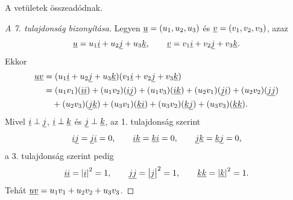 \documentclass[11pt]{article}
\begin{document}
\begin{notefig}{A vetületek összeadódnak.}
\end{notefig}

\begin{proof}[A 7. tulajdonság bizonyítása]
Legyen $\underline{u}=(u_{1}, u_{2}, u_{3})$ és $\underline{v}=(v_{1}, v_{2}, v_{3})$, azaz
\[
\underline{u}=u_{1}\underline{i}+u_{2}\underline{j}+u_{3}\underline{k},\qquad
\underline{v}=v_{1}\underline{i}+v_{2}\underline{j}+v_{3}\underline{k} .
\]
Ekkor
\begin{align*}
\underline{u}\underline{v}&=(u_{1}\underline{i}+u_{2}\underline{j}+u_{3}\underline{k})(v_{1}\underline{i}+v_{2}\underline{j}+v_{3}\underline{k})\\
&=(u_{1}v_{1})(\underline{i}\underline{i})+(u_{1}v_{2})(\underline{i}\underline{j})+(u_{1}v_{3})(\underline{i}\underline{k})
+(u_{2}v_{1})(\underline{j}\underline{i})+(u_{2}v_{2})(\underline{j}\underline{j})\\
&\quad +(u_{2}v_{3})(\underline{j}\underline{k})+(u_{3}v_{1})(\underline{k}\underline{i})+(u_{3}v_{2})(\underline{k}\underline{j})
+(u_{3}v_{3})(\underline{k}\underline{k}).
\end{align*}
Mivel $\underline{i}\perp\underline{j}$, $\underline{i}\perp\underline{k}$ és $\underline{j}\perp\underline{k}$, az 1. tulajdonság szerint
\[
\underline{i}\underline{j}=\underline{j}\underline{i}=0,\qquad \underline{i}\underline{k}=\underline{k}\underline{i}=0,\qquad
\underline{j}\underline{k}=\underline{k}\underline{j}=0,
\]
a 3. tulajdonság szerint pedig
\[
\underline{i}\underline{i}=\left|\underline{i}\right|^{2}=1,\qquad \underline{j}\underline{j}=\left|\underline{j}\right|^{2}=1,\qquad
\underline{k}\underline{k}=\left|\underline{k}\right|^{2}=1 .
\]
Tehát $\underline{u}\underline{v}=u_{1}v_{1}+u_{2}v_{2}+u_{3}v_{3}$.
\end{proof}
\end{document}
